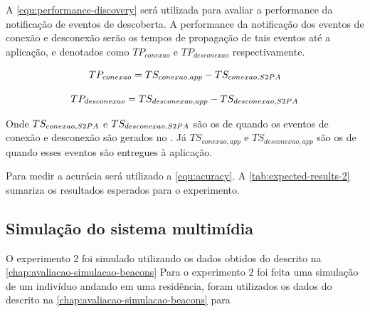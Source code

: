 A \autoref{equ:performance-discovery} será utilizada para avaliar a performance da notificação de eventos de descoberta. A performance da notificação dos eventos de conexão e desconexão serão os tempos de propagação de tais eventos até a aplicação, e denotados como $TP_{conexao}$ e $TP_{desconexao}$ respectivamente.

\begin{equation}
	\label{equ:performance-connection}
	TP_{conexao} = TS_{conexao,app} - TS_{conexao,S2PA{}}
\end{equation}

\begin{equation}
	\label{equ:performance-disconnection}
	TP_{desconexao} = TS_{desconexao,app} - TS_{desconexao,S2PA{}}
\end{equation}

Onde $TS_{conexao,S2PA{}}$ e $TS_{desconexao,S2PA{}}$ são os \timestamps{} de quando os eventos de conexão e desconexão são gerados no \stwopa{}. Já $TS_{conexao,app}$ e $TS_{desconexao,app}$ são os \timestamps{} de quando esses eventos são entregues à aplicação.

Para medir a acurácia será utilizado a \autoref{equ:acuracy}. A \autoref{tab:expected-results-2} sumariza os resultados esperados para o experimento.

\begin{table}[htb]
	\begin{center}
	\end{center}
\end{table}

\subsection{Simulação do sistema multimídia}

O experimento 2 foi simulado utilizando os dados obtidos do \dataset{} descrito na \autoref{chap:avaliacao-simulacao-beacons}
Para o experimento 2 foi feita uma simulação de um indivíduo andando em uma residência, foram utilizados os dados do \dataset{} descrito na \autoref{chap:avaliacao-simulacao-beacons} para 

